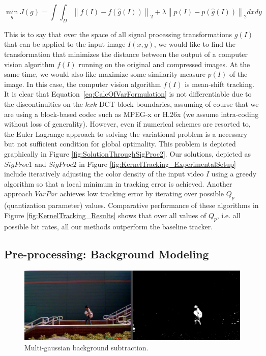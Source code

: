 \documentclass[12pt,letterpaper,doublespaced,ETD,proposal]{gt-ece-thesis}
\begin{document}
\begin{Body}
\begin{equation}
	\label{eq:CalcOfVarFormulation}
  \min_{g} J(g)=\int\int_D \left\|f(I) - f(\hat{g}(I)) \right\|_2  +  \lambda \left\|p(I) -  p(\hat{g}(I)) \right\|_2 dxdy
\end{equation}

This is to say that over the space of all signal processing transformations $g(I)$ that can be applied to the input image $I(x,y)$, we would like to find the transformation that minimizes the distance between the output of a computer vision algorithm $f(I)$ running on the original and compressed images.  At the same time, we would also like maximize some similarity measure $p(I)$ of the image.  In this case, the computer vision algorithm $f(I)$ is mean-shift tracking.  It is clear that Equation~\ref{eq:CalcOfVarFormulation} is not differentiable due to the discontinuities on the $kxk$ DCT block boundaries, assuming of course that we are using a block-based codec such as MPEG-x or H.26x (we assume intra-coding without loss of generality).  However, even if numerical schemes are resorted to, the Euler Lagrange approach to solving the variational problem is a necessary but not sufficient condition for global optimality.  This problem is depicted graphically in Figure \ref{fig:SolutionThroughSigProc2}.  Our solutions, depicted as $SigProc1$ and $SigProc2$ in Figure \ref{fig:KernelTracking_ExperimentalSetup} include iteratively adjusting the color density of the input video $I$ using a greedy algorithm so that a local minimum in tracking error is achieved.  Another approach $VarPar$ achieves low tracking error by iterating over possible $Q_p$ (quantization parameter) values.  Comparative performance of these algorithms in Figure \ref{fig:KernelTracking_Results} shows that over all values of $Q_p$, i.e. all possible bit rates, all our methods outperform the baseline tracker.

\subsection{Pre-processing: Background Modeling}
			\begin{figure}		
					\centering		
					\includegraphics[width=1.0\textwidth]{figs/Proposal_fig12_TRK_multiGaussian}
					\caption{Multi-gaussian background subtraction.}
					\label{fig:MultiGaussian}
			\end{figure}
			

\end{Body}
\end{document}
